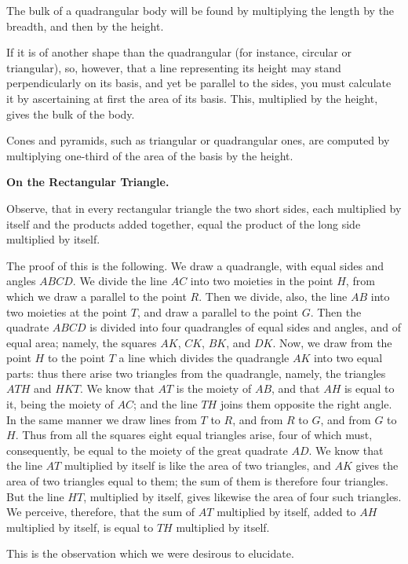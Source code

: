 The bulk of a quadrangular body will be found by multiplying the length by the breadth, and then by the height.

If it is of another shape than the quadrangular (for instance, circular or triangular), so, however, that a line representing its height may stand perpendicularly on its basis, and yet be parallel to the sides, you must calculate it by ascertaining at first the area of its basis. This, multiplied by the height, gives the bulk of the body.

Cones and pyramids, such as triangular or quadrangular ones, are computed by multiplying one-third of the area of the basis by the height.

\vspace{0.5cm}
\noindent\textbf{On the Rectangular Triangle.}

Observe, that in every rectangular triangle the two short sides, each multiplied by itself and the products added together, equal the product of the long side multiplied by itself.

The proof of this is the following. We draw a quadrangle, with equal sides and angles $ABCD$. We divide the line $AC$ into two moieties in the point $H$, from which we draw a parallel to the point $R$. Then we divide, also, the line $AB$ into two moieties at the point $T$, and draw a parallel to the point $G$. Then the quadrate $ABCD$ is divided into four quadrangles of equal sides and angles, and of equal area; namely, the squares $AK$, $CK$, $BK$, and $DK$. Now, we draw from the point $H$ to the point $T$ a line which divides the quadrangle $AK$ into two equal parts: thus there arise two triangles from the quadrangle, namely, the triangles $ATH$ and $HKT$. We know that $AT$ is the moiety of $AB$, and that $AH$ is equal to it, being the moiety of $AC$; and the line $TH$ joins them opposite the right angle. In the same manner we draw lines from $T$ to $R$, and from $R$ to $G$, and from $G$ to $H$. Thus from all the squares eight equal triangles arise, four of which must, consequently, be equal to the moiety of the great quadrate $AD$. We know that the line $AT$ multiplied by itself is like the area of two triangles, and $AK$ gives the area of two triangles equal to them; the sum of them is therefore four triangles. But the line $HT$, multiplied by itself, gives likewise the area of four such triangles. We perceive, therefore, that the sum of $AT$ multiplied by itself, added to $AH$ multiplied by itself, is equal to $TH$ multiplied by itself.

This is the observation which we were desirous to elucidate.

